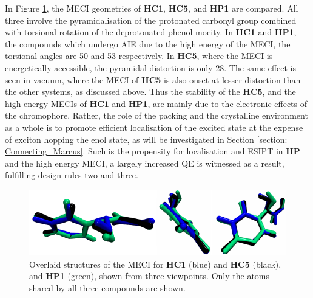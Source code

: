 In Figure \ref{figure: MECI_comparison}, the MECI geometries of \textbf{HC1}, \textbf{HC5}, and \textbf{HP1} are compared. All three involve the pyramidalisation of the protonated carbonyl group  combined with torsional rotation of the deprotonated phenol moeity. In \textbf{HC1} and \textbf{HP1}, the compounds which undergo AIE due to the high energy of the MECI, the torsional angles are 50\degree{} and 53\degree{} respectively. In \textbf{HC5}, where the MECI is energetically accessible, the pyramidal distortion is only 28\degree{}. The same effect is seen in vacuum, where the MECI of \textbf{HC5} is also onset at lesser distortion than the other systems, as discussed above. Thus the stability of the \textbf{HC5}, and the high energy MECIs of \textbf{HC1} and \textbf{HP1}, are mainly due to the electronic effects of the chromophore. Rather, the role of the packing and the crystalline environment as a whole is to promote efficient localisation of the excited state at the expense of exciton hopping the enol state, as will be investigated in Section \ref{section: Connecting_Marcus}. Such is the propensity for localisation and ESIPT in \textbf{HP} and the high energy MECI, a largely increased \ac{QE} is witnessed as a result, fulfilling design rules two and three.
\begin{figure}[t]
\centering
  \includegraphics[width=0.9\linewidth]{5ConnectingCrystalStructure/MECI_comparison.pdf}
  \caption[MECI geometries for \textbf{HC1},\textbf{HC5} \% \textbf{HP1}.]{Overlaid structures of the MECI for \textbf{HC1} (blue) and \textbf{HC5} (black), and \textbf{HP1} (green), shown from three viewpoints. Only the atoms shared by all three compounds are shown.}
  \label{figure: MECI_comparison}
\end{figure}

